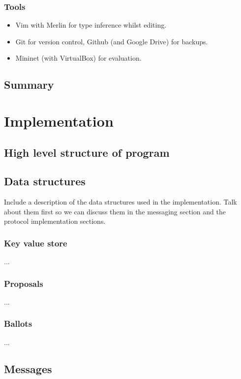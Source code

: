 \documentclass[12pt,twoside,notitlepage]{report}
\begin{document}
\subsection{Tools}

\begin{itemize}
  \item Vim with Merlin for type inference whilst editing.
  \item Git for version control, Github (and Google Drive) for backups.
  \item Mininet (with VirtualBox) for evaluation.
\end{itemize}

\section{Summary}


\newpage


\chapter{Implementation}

\section{High level structure of program}

\section{Data structures}

Include a description of the data structures used in the implementation. Talk about them first so we can discuss them in the messaging section and the protocol implementation sections.

\subsection{Key value store}
...

\subsection{Proposals}
...
\subsection{Ballots}
...

\section{Messages}
\end{document}

